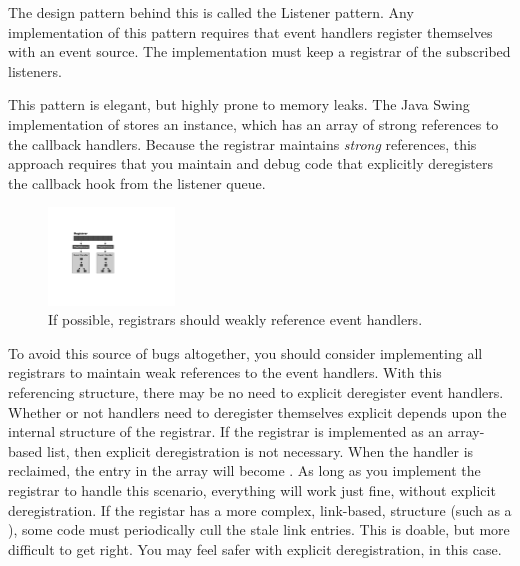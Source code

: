 The design pattern behind this is called the Listener pattern. Any
implementation of this pattern requires that event handlers register themselves
with an event source. The implementation must keep a registrar of the subscribed
listeners.

This pattern is elegant, but highly prone to memory leaks. The Java Swing
implementation of  stores an 
instance, which has an array of strong references to the callback handlers.
Because the registrar maintains \emph{strong} references, this approach requires
that you maintain and debug code that explicitly deregisters the callback hook
from the listener queue.



\begin{figure}
\centering
\includegraphics[width=0.3\textwidth]{part2/Figures/correlated/listeners}
\caption{If possible, registrars should weakly reference event handlers.}
\end{figure}
To avoid this source of bugs altogether, you should consider implementing all
registrars to maintain weak references to the event handlers. With this
referencing structure, there may be no need to explicit deregister event
handlers. Whether or not handlers need to deregister themselves explicit depends
upon the internal structure of the registrar. If the registrar is implemented as
an array-based list, then explicit deregistration is not necessary. When the
handler is reclaimed, the entry in the array will become . As long as
you implement the registrar to handle this scenario, everything will work just
fine, without explicit deregistration. If the registar has a more complex,
link-based, structure (such as a ), some code must
periodically cull the stale link entries. This is doable, but more difficult
to get right. You may feel safer with explicit deregistration, in this case.


